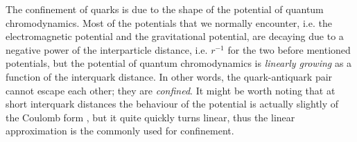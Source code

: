 \documentclass[../main.tex]{subfiles} %
\begin{document}
The confinement of quarks is due to the shape of the potential of quantum chromodynamics. Most of the potentials that we normally encounter, i.e. the electromagnetic potential and the gravitational potential, are decaying due to a negative power of the interparticle distance, i.e. $r^{-1}$ for the two before mentioned potentials, but the potential of quantum chromodynamics is \emph{linearly growing} as a function of the interquark distance. In other words, the quark-antiquark pair cannot escape each other; they are \emph{confined}. It might be worth noting that at short interquark distances the behaviour of the potential is actually slightly of the Coulomb form \cite{petkovic_stringBreakingAndQuarkConfinement_2018}, but it quite quickly turns linear, thus the linear approximation is the commonly used for confinement.
\end{document}
